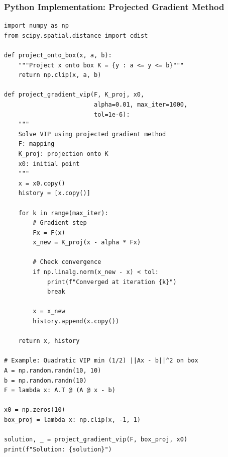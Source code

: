 \documentclass[aspectratio=169,10pt]{beamer}
\begin{document}
\begin{frame}[fragile]
\frametitle{Python Implementation: Projected Gradient Method}

\begin{lstlisting}
import numpy as np
from scipy.spatial.distance import cdist

def project_onto_box(x, a, b):
    """Project x onto box K = {y : a <= y <= b}"""
    return np.clip(x, a, b)

def project_gradient_vip(F, K_proj, x0,
                         alpha=0.01, max_iter=1000,
                         tol=1e-6):
    """
    Solve VIP using projected gradient method
    F: mapping
    K_proj: projection onto K
    x0: initial point
    """
    x = x0.copy()
    history = [x.copy()]

    for k in range(max_iter):
        # Gradient step
        Fx = F(x)
        x_new = K_proj(x - alpha * Fx)

        # Check convergence
        if np.linalg.norm(x_new - x) < tol:
            print(f"Converged at iteration {k}")
            break

        x = x_new
        history.append(x.copy())

    return x, history

# Example: Quadratic VIP min (1/2) ||Ax - b||^2 on box
A = np.random.randn(10, 10)
b = np.random.randn(10)
F = lambda x: A.T @ (A @ x - b)

x0 = np.zeros(10)
box_proj = lambda x: np.clip(x, -1, 1)

solution, _ = project_gradient_vip(F, box_proj, x0)
print(f"Solution: {solution}")
\end{lstlisting}

\end{frame}
\end{document}
